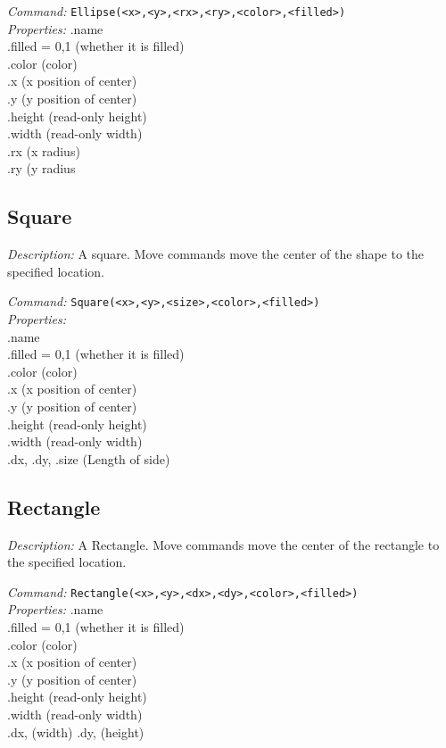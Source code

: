 \emph{Command:}  \verb+Ellipse(<x>,<y>,<rx>,<ry>,<color>,<filled>)+\\

\emph{Properties:}
.name\\
.filled = {0,1} (whether it is filled)\\
.color (color) \\
.x  (x position of center) \\
.y  (y position of center)\\
.height (read-only height)\\
.width (read-only width)\\
.rx  (x radius)\\
.ry  (y radius


\subsection{Square}

\emph{Description:} A square. Move commands move the center
  of the shape to the specified location.

\emph{Command:}  \verb+Square(<x>,<y>,<size>,<color>,<filled>)+\\

\emph{Properties:}\\
.name\\
.filled = 0,1 (whether it is filled)\\
.color (color) \\
.x  (x position of center) \\
.y  (y position of center)\\
.height (read-only height)\\
.width (read-only width)\\
.dx, .dy, .size  (Length of side)\\


\subsection{Rectangle}
\emph{Description:} A Rectangle. Move commands move the center
  of the rectangle to the specified location.

\emph{Command:}  \verb+Rectangle(<x>,<y>,<dx>,<dy>,<color>,<filled>)+\\

\emph{Properties:}
.name\\
.filled = {0,1} (whether it is filled)\\
.color (color) \\
.x  (x position of center) \\
.y  (y position of center)\\
.height (read-only height)\\
.width (read-only width)\\
.dx, (width)
.dy,  (height)\\



